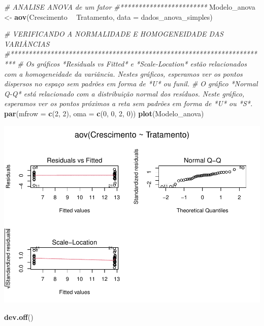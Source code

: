 \documentclass[
]{book}
\newenvironment{Shaded}{\begin{snugshade}}{\end{snugshade}}
\newcommand{\CommentTok}[1]{\textcolor[rgb]{0.56,0.35,0.01}{\textit{#1}}}
\newcommand{\DataTypeTok}[1]{\textcolor[rgb]{0.13,0.29,0.53}{#1}}
\newcommand{\DecValTok}[1]{\textcolor[rgb]{0.00,0.00,0.81}{#1}}
\newcommand{\KeywordTok}[1]{\textcolor[rgb]{0.13,0.29,0.53}{\textbf{#1}}}
\newcommand{\NormalTok}[1]{#1}
\newcommand{\OperatorTok}[1]{\textcolor[rgb]{0.81,0.36,0.00}{\textbf{#1}}}
\newcommand{\StringTok}[1]{\textcolor[rgb]{0.31,0.60,0.02}{#1}}
\begin{document}
\begin{Shaded}
\begin{Highlighting}[]
\CommentTok{# ANALISE ANOVA de um fator}
\CommentTok{#************************}
\NormalTok{Modelo_anova <-}\StringTok{ }\KeywordTok{aov}\NormalTok{(Crescimento }\OperatorTok{~}\StringTok{ }\NormalTok{Tratamento, }\DataTypeTok{data =}\NormalTok{ dados_anova_simples) }

\CommentTok{# VERIFICANDO A NORMALIDADE E HOMOGENEIDADE DAS VARIÂNCIAS}
\CommentTok{#***********************************************************************}
\CommentTok{# Os gráficos *Residuals vs Fitted* e *Scale-Location* estão relacionados com a homogeneidade da variância. Nestes gráficos, esperamos ver os pontos dispersos no espaço sem padrões em forma de *U* ou funil. }
\CommentTok{# O gráfico *Normal Q-Q* está relacionado com a distribuição normal dos resíduos. Neste gráfico, esperamos ver os pontos próximos a reta sem padrões em forma de *U* ou *S*. }
\KeywordTok{par}\NormalTok{(}\DataTypeTok{mfrow =} \KeywordTok{c}\NormalTok{(}\DecValTok{2}\NormalTok{, }\DecValTok{2}\NormalTok{), }\DataTypeTok{oma =} \KeywordTok{c}\NormalTok{(}\DecValTok{0}\NormalTok{, }\DecValTok{0}\NormalTok{, }\DecValTok{2}\NormalTok{, }\DecValTok{0}\NormalTok{))}
\KeywordTok{plot}\NormalTok{(Modelo_anova)}
\end{Highlighting}
\end{Shaded}

\includegraphics{livro_r_ecologia_files/figure-latex/unnamed-chunk-13-1.pdf}

\begin{Shaded}
\begin{Highlighting}[]
\KeywordTok{dev.off}\NormalTok{()}
\end{Highlighting}
\end{Shaded}
\end{document}
